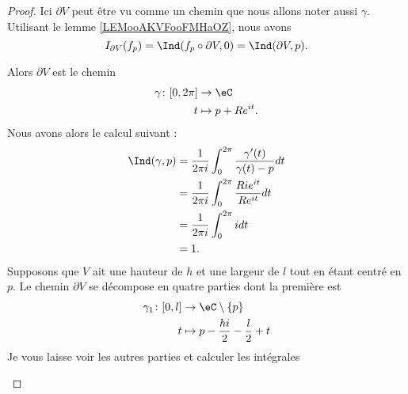 \begin{proof}
	Ici \( \partial V\) peut être vu comme un chemin que nous allons noter aussi \( \gamma\). Utilisant le lemme \ref{LEMooAKVFooFMHaOZ}, nous avons
	\begin{equation}        \label{EQooRSXRooTJwDNP}
		I_{\partial V}(f_p)=\Ind(f_p\circ\partial V,0)=\Ind(\partial V,p).
	\end{equation}

	\begin{subproof}
		Alors \( \partial V\) est le chemin
		\begin{equation}
			\begin{aligned}
				\gamma\colon \mathopen[ 0 , 2\pi \mathclose] & \to \eC             \\
				t                                            & \mapsto p+R e^{it}.
			\end{aligned}
		\end{equation}
		Nous avons alors le calcul suivant :
		\begin{subequations}
			\begin{align}
				\Ind(\gamma,p) & =\frac{1}{ 2\pi i }\int_0^{2\pi}\frac{ \gamma'(t) }{ \gamma(t)-p }dt \\
				               & =\frac{1}{ 2\pi i }\int_0^{2\pi}\frac{ Ri e^{it} }{ R e^{it} }dt     \\
				               & =\frac{1}{ 2\pi i }\int_0^{2\pi}idt                                  \\
				               & =1.
			\end{align}
		\end{subequations}
		Supposons que \( V\) ait une hauteur de \( h\) et une largeur de \( l\) tout en étant centré en \( p\). Le chemin \( \partial V\) se décompose en quatre parties dont la première est
		\begin{equation}
			\begin{aligned}
				\gamma_1\colon \mathopen[ 0 , l \mathclose] & \to \eC\setminus \{ p \}                   \\
				t                                           & \mapsto p-\frac{ hi }{ 2 }-\frac{ l }{2}+t
			\end{aligned}
		\end{equation}
		Je vous laisse voir les autres parties et calculer les intégrales


\end{subproof}
\end{proof}
